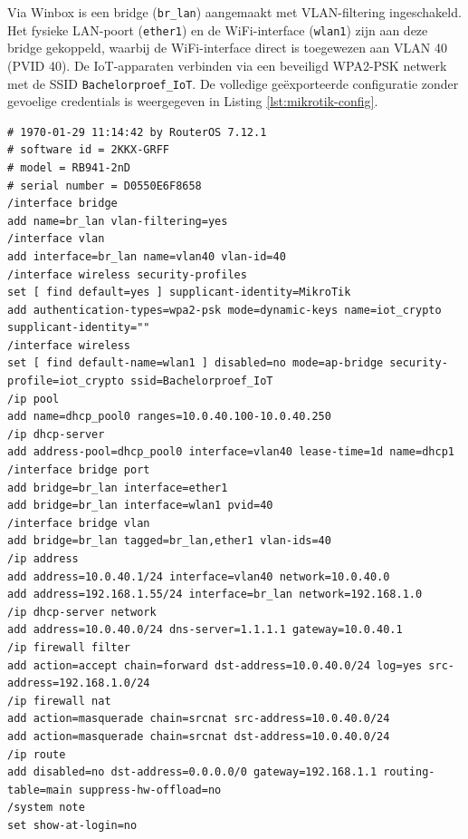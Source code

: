 Via Winbox is een bridge (\texttt{br\_lan}) aangemaakt met VLAN-filtering ingeschakeld. Het fysieke LAN-poort (\texttt{ether1}) en de WiFi-interface (\texttt{wlan1}) zijn aan deze bridge gekoppeld, waarbij de WiFi-interface direct is toegewezen aan VLAN 40 (PVID 40). De IoT-apparaten verbinden via een beveiligd WPA2-PSK netwerk met de SSID \texttt{Bachelorproef\_IoT}. 
De volledige geëxporteerde configuratie zonder gevoelige credentials is weergegeven in Listing \ref{lst:mikrotik-config}.


\begin{listing}[H]
\begin{verbatim}
# 1970-01-29 11:14:42 by RouterOS 7.12.1
# software id = 2KKX-GRFF
# model = RB941-2nD
# serial number = D0550E6F8658
/interface bridge
add name=br_lan vlan-filtering=yes
/interface vlan
add interface=br_lan name=vlan40 vlan-id=40
/interface wireless security-profiles
set [ find default=yes ] supplicant-identity=MikroTik
add authentication-types=wpa2-psk mode=dynamic-keys name=iot_crypto supplicant-identity=""
/interface wireless
set [ find default-name=wlan1 ] disabled=no mode=ap-bridge security-profile=iot_crypto ssid=Bachelorproef_IoT
/ip pool
add name=dhcp_pool0 ranges=10.0.40.100-10.0.40.250
/ip dhcp-server
add address-pool=dhcp_pool0 interface=vlan40 lease-time=1d name=dhcp1
/interface bridge port
add bridge=br_lan interface=ether1
add bridge=br_lan interface=wlan1 pvid=40
/interface bridge vlan
add bridge=br_lan tagged=br_lan,ether1 vlan-ids=40
/ip address
add address=10.0.40.1/24 interface=vlan40 network=10.0.40.0
add address=192.168.1.55/24 interface=br_lan network=192.168.1.0
/ip dhcp-server network
add address=10.0.40.0/24 dns-server=1.1.1.1 gateway=10.0.40.1
/ip firewall filter
add action=accept chain=forward dst-address=10.0.40.0/24 log=yes src-address=192.168.1.0/24
/ip firewall nat
add action=masquerade chain=srcnat src-address=10.0.40.0/24
add action=masquerade chain=srcnat dst-address=10.0.40.0/24
/ip route
add disabled=no dst-address=0.0.0.0/0 gateway=192.168.1.1 routing-table=main suppress-hw-offload=no
/system note
set show-at-login=no
\end{verbatim}
\caption{Geëxporteerde RouterOS configuratie van de MikroTik hAP ac lite voor VLAN 40 scheiding.}
\label{lst:mikrotik-config}
\end{listing}





\chapter{}%
\label{ch:Ontwikkeling van custom rules}

